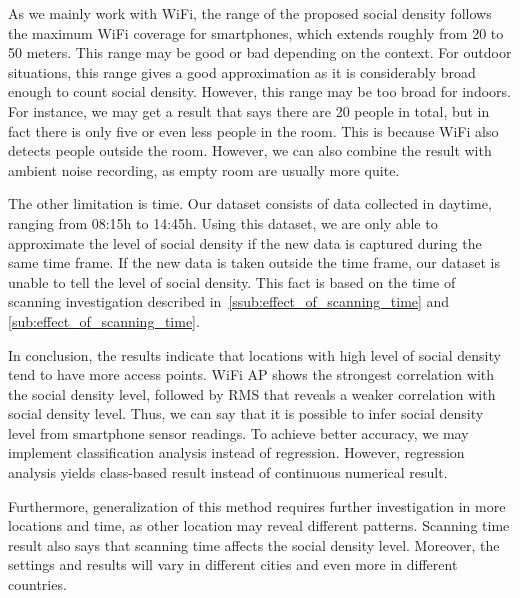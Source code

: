 As we mainly work with WiFi, the range of the proposed social density follows the maximum WiFi coverage for smartphones, which extends roughly from 20 to 50 meters. This range may be good or bad depending on the context. For outdoor situations, this range gives a good approximation as it is considerably broad enough to count social density. However, this range may be too broad for indoors. For instance, we may get a result that says there are 20 people in total, but in fact there is only five or even less people in the room. This is because WiFi also detects people outside the room. However, we can also combine the result with ambient noise recording, as empty room are usually more quite.


The other limitation is time. Our dataset consists of data collected in daytime, ranging from 08:15h to 14:45h. Using this dataset, we are only able to approximate the level of social density if the new data is captured during the same time frame. If the new data is taken outside the time frame, our dataset is unable to tell the level of social density. This fact is based on the time of scanning investigation described in~\autoref{ssub:effect_of_scanning_time} and \autoref{sub:effect_of_scanning_time}.


In conclusion, the results indicate that locations with high level of social density tend to have more access points. WiFi \ac{AP} shows the strongest correlation with the social density level, followed by \ac{RMS} that reveals a weaker correlation with social density level. Thus, we can say that it is possible to infer social density level from smartphone sensor readings. To achieve better accuracy, we may implement classification analysis instead of regression. However, regression analysis yields class-based result instead of continuous numerical result.

Furthermore, generalization of this method requires further investigation in more locations and time, as other location may reveal different patterns.
Scanning time result also says that scanning time affects the social density level. Moreover, the settings and results will vary in different cities and even more in different countries.

